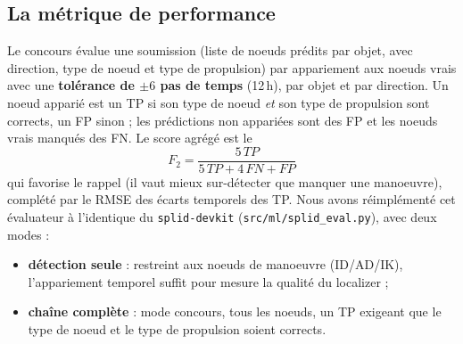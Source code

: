 \documentclass{article}
\begin{document}
\vspace{0.3cm}
\noindent{}
\vspace{0.3cm}

\subsection{La métrique de performance}

Le concours évalue une soumission (liste de noeuds prédits par objet, avec direction, type de noeud et type de propulsion) par appariement aux noeuds vrais avec une \textbf{tolérance de $\pm 6$ pas de temps} (12\,h), par objet et par direction. Un noeud apparié est un TP si son type de noeud \emph{et} son type de propulsion sont corrects, un FP sinon ; les prédictions non appariées sont des FP et les noeuds vrais manqués des FN. Le score agrégé est le
$$
F_2 = \dfrac{5\,TP}{5\,TP + 4\,FN + FP}
$$
qui favorise le rappel (il vaut mieux sur-détecter que manquer une manoeuvre), complété par le RMSE des écarts temporels des TP.
Nous avons réimplémenté cet évaluateur à l'identique du \texttt{splid-devkit} (\texttt{src/ml/splid\_eval.py}), avec deux modes :
\begin{itemize}
    \item \textbf{détection seule} : restreint aux noeuds de manoeuvre (ID/AD/IK), l'appariement temporel suffit pour mesure la qualité du localizer ;
    \item \textbf{chaîne complète} : mode concours, tous les noeuds, un TP exigeant que le type de noeud et le type de propulsion soient corrects.
\end{itemize}
\end{document}
